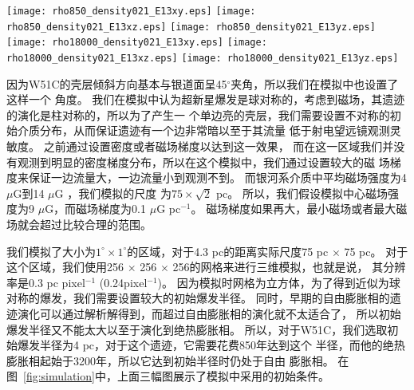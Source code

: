 \begin{figure*}
    \centering
    \texttt{[image: rho850\_density021\_E13xy.eps]}
    \texttt{[image: rho850\_density021\_E13xz.eps]}
    \texttt{[image: rho850\_density021\_E13yz.eps]}\newline
    \texttt{[image: rho18000\_density021\_E13xy.eps]}
    \texttt{[image: rho18000\_density021\_E13xz.eps]}
    \texttt{[image: rho18000\_density021\_E13yz.eps]}
    \caption{模拟的密度-磁场图像。所有的图都是沿着一个三维立体图像沿着中心切片后得到的
    从不同方向看的结果。背景彩色图像是密度分布，白色箭头显示了磁场的方向和强度。上面三幅
    显示的是初始条件，下面三幅显示了经过18000年演化后的结果。上面三幅图中，中心磁场的强度
    是9$\mu G$。}
\label{fig:simulation}
\end{figure*}

因为W51C的壳层倾斜方向基本与银道面呈45$^{\circ}$夹角，所以我们在模拟中也设置了这样一个
角度。
我们在模拟中认为超新星爆发是球对称的，考虑到磁场，其遗迹的演化是柱对称的，所以为了产生一
个单边亮的壳层，我们需要设置不对称的初始介质分布，从而保证遗迹有一个边非常暗以至于其流量
低于射电望远镜观测灵敏度。
之前\citet{Orlando2007}通过设置密度或者磁场梯度以达到这一效果，
而在这一区域我们并没有观测到明显的密度梯度分布，所以在这个模拟中，我们通过设置较大的磁
场梯度来保证一边流量大，一边流量小到观测不到。
而银河系介质中平均磁场强度为4 $\mu$G到14 $\mu$G \citep{Haverkorn2015}，我们模拟的尺度
为$75 \times \sqrt{2}$ pc。
所以，我们假设模拟中心磁场强度为9 $\mu$G，而磁场梯度为0.1 $\mu$G pc$^{-1}$。
磁场梯度如果再大，最小磁场或者最大磁场就会超过比较合理的范围。

我们模拟了大小为$1^\circ \times 1^\circ$的区域，对于4.3 pc的距离实际尺度75 pc $\times$
75 pc。
对于这个区域，我们使用256 $\times$ 256 $\times$ 256的网格来进行三维模拟，也就是说，
其分辨率是0.3 pc pixel$^{-1}$ (0.24\am pixel$^{-1}$)。
因为模拟时网格为立方体，为了得到近似为球对称的爆发，我们需要设置较大的初始爆发半径。
同时，早期的自由膨胀相的遗迹演化可以通过解析解得到，而超过自由膨胀相的演化就不太适合了，
所以初始爆发半径又不能太大以至于演化到绝热膨胀相。
所以，对于W51C，我们选取初始爆发半径为4 pc，对于这个遗迹，它需要花费850年达到这个
半径，而他的绝热膨胀相起始于3200年\citep{Leahy2017a}，所以它达到初始半径时仍处于自由
膨胀相。
在图~\ref{fig:simulation}中，上面三幅图展示了模拟中采用的初始条件。

